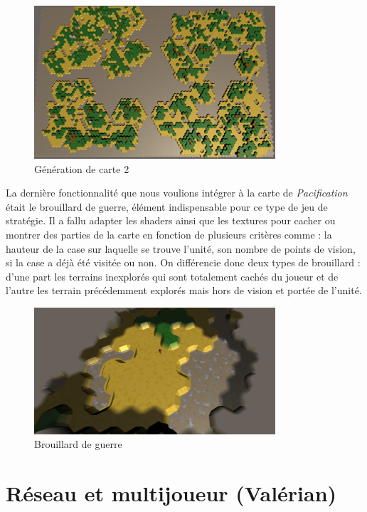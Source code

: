 \documentclass[12pt]{report}
\begin{document}
\begin{figure}[H]
    \centering
    \includegraphics[width=0.8\textwidth]{MapGen2}
    \caption{Génération de carte 2}
\end{figure}

La dernière fonctionnalité que nous voulions intégrer à la carte de
\textit{Pacification} était le brouillard de guerre, élément indispensable pour
ce type de jeu de stratégie. Il a fallu adapter les shaders ainsi que les
textures pour cacher ou montrer des parties de la carte en fonction de
plusieurs critères comme : la hauteur de la case sur laquelle se trouve
l'unité, son nombre de points de vision, si la case a déjà été visitée ou non.
On différencie donc deux types de brouillard : d'une part les terrains
inexplorés qui sont totalement cachés du joueur et de l'autre les terrain
précédemment explorés mais hors de vision et portée de l'unité.

\begin{figure}[H]
    \centering
    \includegraphics[width=0.8\textwidth]{FogOfWar}
    \caption{Brouillard de guerre}
\end{figure}

\section{Réseau et multijoueur (Valérian)}
\end{document}
